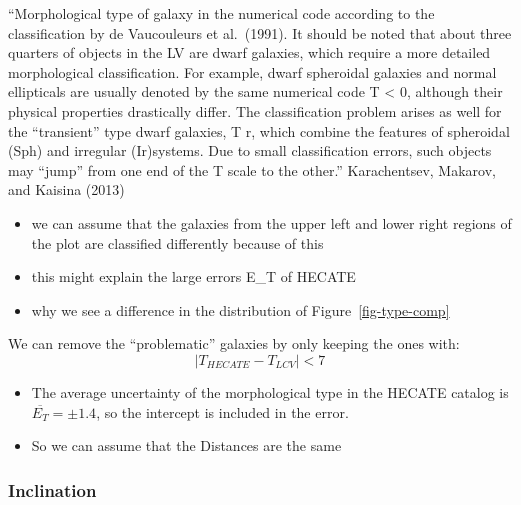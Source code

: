 \documentclass[
]{article}
\providecommand{\tightlist}{%
  \setlength{\itemsep}{0pt}\setlength{\parskip}{0pt}}\usepackage{longtable,booktabs,array}
\begin{document}
``Morphological type of galaxy in the numerical code according to the
classification by de Vaucouleurs et al.~(1991). It should be noted that
about three quarters of objects in the LV are dwarf galaxies, which
require a more detailed morphological classification. For example, dwarf
spheroidal galaxies and normal ellipticals are usually denoted by the
same numerical code T \textless{} 0, although their physical properties
drastically differ. The classification problem arises as well for the
``transient'' type dwarf galaxies, T r, which combine the features of
spheroidal (Sph) and irregular (Ir)systems. Due to small classification
errors, such objects may ``jump'' from one end of the T scale to the
other.'' Karachentsev, Makarov, and Kaisina (2013)

\begin{itemize}
\tightlist
\item
  we can assume that the galaxies from the upper left and lower right
  regions of the plot are classified differently because of this
\item
  this might explain the large errors E\_T of HECATE
\item
  why we see a difference in the distribution of
  Figure~\ref{fig-type-comp}
\end{itemize}

We can remove the ``problematic'' galaxies by only keeping the ones
with: \[
|{T_{HECATE}-T_{LCV}}|<7
\]

\begin{itemize}
\tightlist
\item
  The average uncertainty of the morphological type in the HECATE
  catalog is \(\overline{E_T} = \pm 1.4\), so the intercept is included
  in the error.
\item
  So we can assume that the Distances are the same
\end{itemize}

\subsubsection{Inclination}
\end{document}
